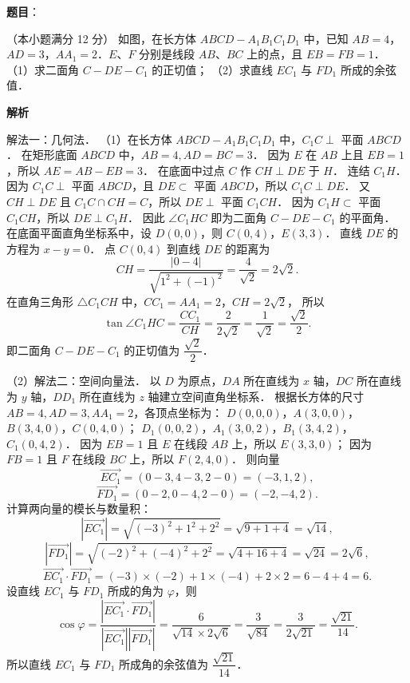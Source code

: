 \begin{answer}

\textbf{题目}：

（本小题满分 12 分）
如图，在长方体 $ABCD - A_1B_1C_1D_1$ 中，已知 $AB = 4$，$AD = 3$，$AA_1 = 2$．$E$、$F$ 分别是线段 $AB$、$BC$ 上的点，且 $EB = FB = 1$．
（1）求二面角 $C - DE - C_1$ 的正切值；
（2）求直线 $EC_1$ 与 $FD_1$ 所成的余弦值．
\nopagebreak[4]
\begin{center}\end{center}
\nopagebreak[4]
\textbf{解析}
\nopagebreak[4]
\begin{center}\end{center}
\nopagebreak[4]
解法一：几何法．
（1）在长方体 $ABCD - A_1B_1C_1D_1$ 中，$C_1C \perp$ 平面 $ABCD$．
在矩形底面 $ABCD$ 中，$AB = 4, AD = BC = 3$．
因为 $E$ 在 $AB$ 上且 $EB = 1$，所以 $AE = AB - EB = 3$．
在底面中过点 $C$ 作 $CH \perp DE$ 于 $H$．
连结 $C_1H$．
因为 $C_1C \perp$ 平面 $ABCD$，且 $DE \subset$ 平面 $ABCD$，所以 $C_1C \perp DE$．
又 $CH \perp DE$ 且 $C_1C \cap CH = C$，所以 $DE \perp$ 平面 $C_1CH$．
因为 $C_1H \subset$ 平面 $C_1CH$，所以 $DE \perp C_1H$．
因此 $\angle C_1HC$ 即为二面角 $C - DE - C_1$ 的平面角．
在底面平面直角坐标系中，设 $D(0, 0)$，则 $C(0, 4)$，$E(3, 3)$．
直线 $DE$ 的方程为 $x - y = 0$．
点 $C(0, 4)$ 到直线 $DE$ 的距离为
\nopagebreak[4]
\[
CH = \dfrac{|0 - 4|}{\sqrt{1^2 + (-1)^2}} = \dfrac{4}{\sqrt{2}} = 2\sqrt{2}.
\]
在直角三角形 $\triangle C_1CH$ 中，$CC_1 = AA_1 = 2$，$CH = 2\sqrt{2}$，
所以
\nopagebreak[4]
\[
\tan\angle C_1HC = \dfrac{CC_1}{CH} = \dfrac{2}{2\sqrt{2}} = \dfrac{1}{\sqrt{2}} = \dfrac{\sqrt{2}}{2}.
\]
即二面角 $C - DE - C_1$ 的正切值为 $\dfrac{\sqrt{2}}{2}$．

（2）解法二：空间向量法．
以 $D$ 为原点，$DA$ 所在直线为 $x$ 轴，$DC$ 所在直线为 $y$ 轴，$DD_1$ 所在直线为 $z$ 轴建立空间直角坐标系．
根据长方体的尺寸 $AB = 4, AD = 3, AA_1 = 2$，各顶点坐标为：
$D(0, 0, 0)$，$A(3, 0, 0)$，$B(3, 4, 0)$，$C(0, 4, 0)$；
$D_1(0, 0, 2)$，$A_1(3, 0, 2)$，$B_1(3, 4, 2)$，$C_1(0, 4, 2)$．
因为 $EB = 1$ 且 $E$ 在线段 $AB$ 上，所以 $E(3, 3, 0)$；
因为 $FB = 1$ 且 $F$ 在线段 $BC$ 上，所以 $F(2, 4, 0)$．
则向量
\nopagebreak[4]
\[
\vec{EC_1} = (0 - 3, 4 - 3, 2 - 0) = (-3, 1, 2),
\]
\nopagebreak[4]
\[
\vec{FD_1} = (0 - 2, 0 - 4, 2 - 0) = (-2, -4, 2).
\]
计算两向量的模长与数量积：
\nopagebreak[4]
\[
|\vec{EC_1}| = \sqrt{(-3)^2 + 1^2 + 2^2} = \sqrt{9 + 1 + 4} = \sqrt{14},
\]
\nopagebreak[4]
\[
|\vec{FD_1}| = \sqrt{(-2)^2 + (-4)^2 + 2^2} = \sqrt{4 + 16 + 4} = \sqrt{24} = 2\sqrt{6},
\]
\nopagebreak[4]
\[
\vec{EC_1} \cdot \vec{FD_1} = (-3) \times (-2) + 1 \times (-4) + 2 \times 2 = 6 - 4 + 4 = 6.
\]
设直线 $EC_1$ 与 $FD_1$ 所成的角为 $\varphi$，则
\nopagebreak[4]
\[
\cos\varphi = \dfrac{|\vec{EC_1} \cdot \vec{FD_1}|}{|\vec{EC_1}||\vec{FD_1}|} = \dfrac{6}{\sqrt{14} \times 2\sqrt{6}} = \dfrac{3}{\sqrt{84}} = \dfrac{3}{2\sqrt{21}} = \dfrac{\sqrt{21}}{14}.
\]
所以直线 $EC_1$ 与 $FD_1$ 所成角的余弦值为 $\dfrac{\sqrt{21}}{14}$．


\end{answer}
